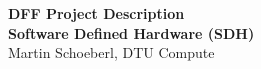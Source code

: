 \documentclass[fleqn,12pt]{article}
\begin{document}
\setlength{\baselineskip}{1.44\baselineskip}


\begin{center}
  {\LARGE\bf DFF Project Description }\\[1ex]
  {\LARGE\bf Software Defined Hardware (SDH)}\\[1ex]
  {\large Martin Schoeberl, DTU Compute}\\[1ex]
 \end{center}




%
%
\end{document}
